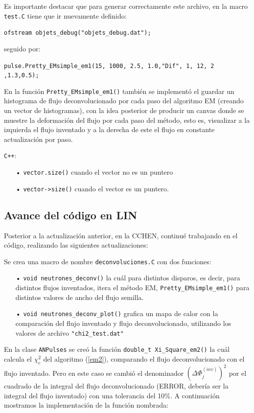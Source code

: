 \documentclass[11pt,letterpaper]{article}
\begin{document}
Es importante destacar que para generar correctamente este archivo, en la macro \verb|test.C| tiene que ir nuevamente definido:

\verb|ofstream objets_debug("objets_debug.dat");|

seguido por:

\verb|pulse.Pretty_EMsimple_em1(15, 1000, 2.5, 1.0,"Dif", 1, 12, 2 ,1.3,0.5);|

En la función \verb|Pretty_EMsimple_em1()| también se implementó el guardar un histograma de flujo deconvolucionado por cada paso del algoritmo EM (creando un vector de histogramas), con la idea posterior de producir un canvas donde  se muestre la deformación del flujo  por cada paso del método, esto es, visualizar a la izquierda el flujo inventado y a la derecha de este el flujo en constante actualización por paso. 

\begin{tipt}
\verb|C++|:
\begin{itemize}
\item[•] \verb|vector.size()| cuando el vector no es un puntero
\item[•]  \verb|vector->size()| cuando el vector es un puntero.
\end{itemize}
\end{tipt}

\subsection*{Avance del código en LIN}
Posterior a la actualización anterior, en la CCHEN, continué trabajando en el código, realizando las siguientes actualizaciones:

Se crea una macro de nombre \verb|deconvoluciones.C| con dos funciones:

\begin{itemize}
\item[•] \verb|void neutrones_deconv()| la cuál para distintos disparos, es decir, para distintos flujos inventados, itera el método EM, \verb|Pretty_EMsimple_em1()| para distintos valores de ancho del flujo semilla.
\item[•]\verb|void neutrones_deconv_plot()| grafica un mapa de calor con la comparación del flujo inventado y flujo deconvolucionado, utilizando los valores de archivo \verb|"chi2_test.dat"|
\end{itemize}

En la clase \verb|ANPulses| se creó la función \verb|double_t Xi_Square_em2()| la cuál calcula el $\chi_c^2$ del algoritmo (\ref{em2}), comparando el flujo deconvolucionado con el flujo inventado. Pero en este caso se cambió el denominador $\left(\Delta \Phi_j^{(inv)}\right)^2$ por el cuadrado de la integral del flujo deconvolucionado (ERROR, debería ser la integral del flujo inventado) con una tolerancia del 10\%. A continuación mostramos la implementación de la función nombrada: 
\end{document}
